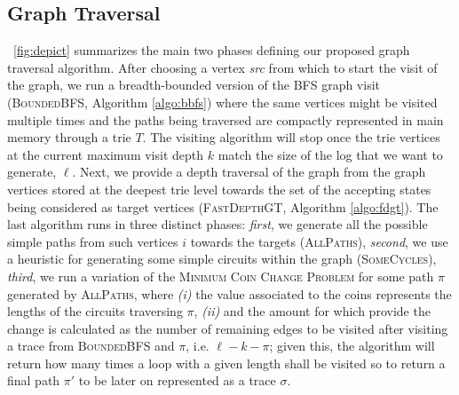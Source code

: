 \documentclass[acmengage]{acmart}
\begin{document}
\subsection{Graph Traversal}\label{sec:gtrav}
\figurename~\ref{fig:depict} summarizes the main two phases defining our proposed graph traversal algorithm. After choosing a vertex \textit{src} from which to start the visit of the graph, we run a breadth-bounded version of the BFS graph visit (\textsc{BoundedBFS}, Algorithm \ref{algo:bbfs}) where the same vertices might be visited multiple times and the paths being traversed are compactly represented in main memory through a trie $T$. The visiting algorithm will stop once the trie vertices at the current maximum visit depth $k$ match the size of the log that we want to generate, $\ell$.  Next, we provide a depth traversal of the graph from the graph vertices stored at the deepest trie level towards the set of the accepting states being considered as target vertices (\textsc{FastDepthGT}, Algorithm \ref{algo:fdgt}). The last algorithm runs in  three distinct phases: \textit{first}, we generate all the possible simple paths from such vertices $i$ towards the targets (\textsc{AllPaths}), \textit{second}, we use a heuristic for generating some simple circuits within the graph (\textsc{SomeCycles}), \textit{third}, we run a variation of the \textsc{Minimum Coin Change Problem} for some path $\pi$ generated by \textsc{AllPaths}, where \textit{(i)} the value associated to the coins represents the lengths of the circuits traversing $\pi$, \textit{(ii)} and the amount for which provide  the change is calculated as the number of remaining edges to be visited after visiting a trace from \textsc{BoundedBFS} and $\pi$, i.e. $\ell-k-\pi$; given this, the algorithm will return how many times a loop with a given length shall be visited so to return a final path $\pi'$ to be later on represented as a trace $\sigma$.
\end{document}
